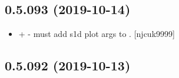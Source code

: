 \documentclass[a4paper,10pt,english]{report}
\begin{document}
\subsection{0.5.093 (2019-10-14)}
\label{\detokenize{misc/changelog:id50}}\begin{itemize}
\item {} 
 +
 - must add s1d plot args to
. {[}njcuk9999{]}

\end{itemize}


\subsection{0.5.092 (2019-10-13)}
\end{document}
